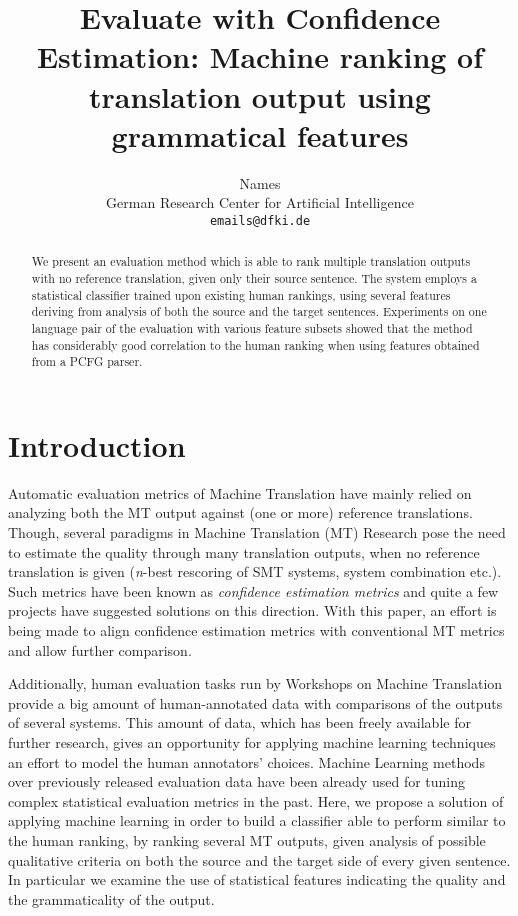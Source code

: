 \documentclass[11pt]{article}
\title{Evaluate with Confidence Estimation: Machine ranking of translation
output using grammatical features}
\author{
  Names \\
  German Research Center for Artificial Intelligence \\
  {\tt emails@dfki.de} 
  }
\date{}
\begin{document}
\maketitle
\begin{abstract}
We present an evaluation method which is able to rank multiple translation
outputs with no reference translation, given only their source sentence. The
system employs a statistical classifier trained upon existing human rankings, 
using several features deriving from analysis of both the source and the target sentences. Experiments  on
one language pair of the evaluation with various feature subsets showed 
that the method has considerably good correlation to the human ranking 
when using features obtained from a PCFG parser.
  
\end{abstract}

\section{Introduction}
Automatic evaluation metrics of Machine Translation have mainly relied on
analyzing both the MT output against (one or more) reference translations.
Though, several paradigms in Machine Translation (MT) Research pose the need to
estimate the quality through many translation outputs, when no reference translation is given (\textit{n}-best rescoring of SMT
systems, system combination etc.). Such metrics have been
known as \textit{confidence estimation metrics} and quite a few projects have
suggested solutions on this direction. %
With this paper, an effort is being made to align confidence estimation metrics
with conventional MT metrics and allow further comparison.

Additionally, human evaluation tasks run by Workshops on Machine
Translation provide a big amount of human-annotated data
with comparisons of the outputs of several systems. This amount of data,
which has been freely available for further research, gives an opportunity for
applying machine learning techniques an effort to model the
human annotators' choices. Machine Learning methods over previously released evaluation data
have been already used for tuning complex statistical evaluation metrics in the
past. %
Here, we propose a solution of applying machine learning in order to build a
classifier able to perform similar to the human ranking, by
ranking several MT outputs, given analysis of possible qualitative criteria on
both the source and the target side of every given sentence. In particular we
examine the use of statistical features indicating the quality and the
grammaticality of the output.
\end{document}
